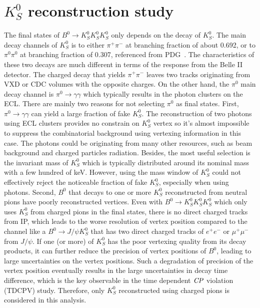 \chapter{$K_S^0$ reconstruction study}

The final states of $B^0 \to K_S^0  K_S^0  K_S^0 $ only depends on the decay of $K_S^0$. The main decay channels of $K_S^0$ is to either $\pi^+ \pi^-$ at branching fraction of about 0.692, or to $\pi^0 \pi^0$ at branching fraction of 0.307, referenced from PDG~\cite{pdg}.
 The characteristics of these two decays are much different in terms of the response from the Belle II detector. The charged decay that yields  $\pi^+ \pi^-$ leaves two tracks originating from VXD or CDC volumes with the opposite charges. On the other hand, the $\pi^0$ main decay channel is $\pi^0 \to \gamma \gamma$ which typically results in the photon clusters on the ECL. There are mainly two reasons for not selecting $\pi^0$ as final states.
 First, $\pi^0 \to \gamma \gamma$ can yield a large fraction of fake $K_S^0$. The reconstruction of two photons using ECL clusters provides no constrain on $K_S^0$ vertex so it's almost impossible to suppress the combinatorial background using vertexing information in this case. The photons could be originating from many other resources, such as beam background and charged particles radiation. Besides, the most useful selection is the invariant mass of $K_S^0$ which is typically distributed around its nominal mass with a few hundred of keV. However, using the mass window of $K_S^0$ could not effectively reject the noticeable fraction of fake $K_S^0$, especially when using photons. Second, $B^0$ that decays to one or more $K_S^0$ reconstructed from neutral pions have poorly reconstructed vertices. Even with $B^0 \to K_S^0  K_S^0  K_S^0 $ which only uses $K_S^0$ from charged pions in the final states, there is no direct charged tracks from IP, which leads to the worse resolution of vertex position compared to the channel like a $B^0 \to J/\psi K_S^0$ that has two direct charged tracks of $e^+e^-$ or $\mu^+ \mu^-$ from $J/\psi$. If one (or more) of $K^0_S$ has the poor vertexing quality from its decay products, it can further reduce the precision of vertex positions of $B^0$, leading to large uncertainties on the vertex positions. Such a degradation of precision of the vertex position eventually results in the large uncertainties in decay time difference, which is the key observable in the time dependent $\it{CP}$ violation (TDCPV) study. Therefore, only $K_S^0$ reconstructed using charged pions is considered in this analysis.
 
